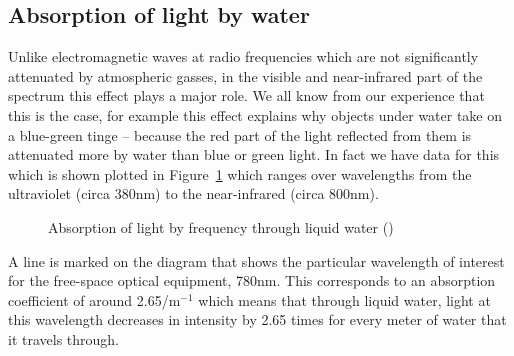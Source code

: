 \subsection{Absorption of light by water}
\label{sec:absorption}

Unlike electromagnetic waves at radio frequencies which are not
significantly attenuated by atmospheric gasses, in the visible and
near-infrared part of the spectrum this effect plays a major role. We
all know from our experience that this is the case, for example this
effect explains why objects under water take on a blue-green tinge --
because the red part of the light reflected from them is attenuated
more by water than blue or green light. In fact we have data for this
which is shown plotted in Figure~\ref{fig:absorption-liquid} which
ranges over wavelengths from the ultraviolet (circa 380nm) to the
near-infrared (circa 800nm).
\begin{figure}[h]
  \centering
  \caption{Absorption of light by frequency through liquid water
    (\cite{jonasz_absorption_2007})}
  \label{fig:absorption-liquid}
\end{figure}

A line is marked on the diagram that shows the particular wavelength
of interest for the free-space optical equipment, 780nm. This
corresponds to an absorption coefficient of around 2.65/m$^{-1}$ which
means that through liquid water, light at this wavelength decreases in
intensity by 2.65 times for every meter of water that it travels
through.

